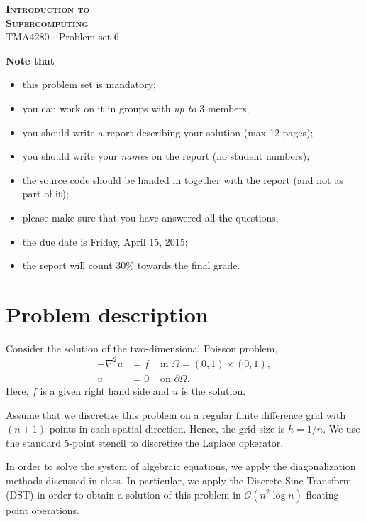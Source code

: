 \documentclass[onecolumn, oneside, a4paper, 11pt]{memoir}
\theoremstyle{remark}
\begin{document}
\pagestyle{empty}

\begin{center}
  {\Huge \bfseries \scshape
    Introduction to \\[0.2\baselineskip] Supercomputing} \\[2\baselineskip]
  {\Large TMA4280 $\cdot$ Problem set 6} \\[2\baselineskip]
\end{center}

\textbf{Note that}
\begin{itemize}
\item this problem set is mandatory;
\item you can work on it in groups with \emph{up to} 3 members;
\item you should write a report describing your solution (max 12 pages);
\item you should write your \emph{names} on the report (no student numbers);
\item the source code should be handed in together with the report (and not as
  part of it);
\item please make sure that you have answered all the questions;
\item the due date is Friday, April 15, 2015;
\item the report will count 30\% towards the final grade.
\end{itemize}


\section{Problem description}

Consider the solution of the two-dimensional Poisson problem,
\begin{align*}
  -\nabla^2 u &= f & \text{ in } \Omega = (0,1) \times (0,1), \\
  u &= 0 & \text{ on } \partial\Omega.
\end{align*}
Here, $f$ is a given right hand side and $u$ is the solution.

Assume that we discretize this problem on a regular finite difference grid with
$(n+1)$ points in each spatial direction. Hence, the grid size is $h=1/n$. We
use the standard 5-point stencil to discretize the Laplace opkerator.

In order to solve the system of algebraic equations, we apply the
diagonalization methods discussed in class. In particular, we apply the Discrete
Sine Transform (DST) in order to obtain a solution of this problem in
$\mathcal{O}(n^2\log n)$ floating point operations.
\end{document}
